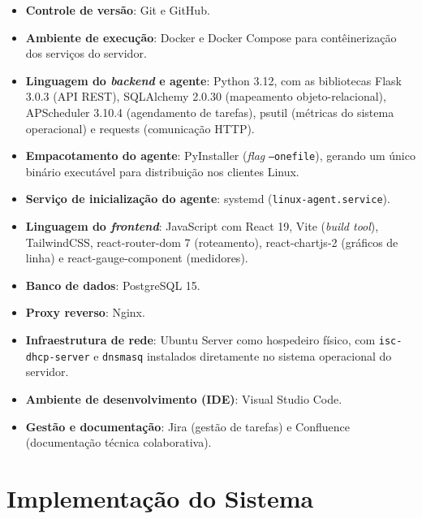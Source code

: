 \documentclass[
    12pt
    ,oneside
    ,a4paper
    ,chapter=TITLE
    ,section=TITLE
    ,sumario=abnt-6027-2012]{abntex2}
\begin{document}
\begin{itemize}
    \item \textbf{Controle de versão}: Git e GitHub.
    \item \textbf{Ambiente de execução}: Docker e Docker Compose para contêinerização
          dos serviços do servidor.
    \item \textbf{Linguagem do \textit{backend} e agente}: Python 3.12, com as
          bibliotecas Flask 3.0.3 (API REST), SQLAlchemy 2.0.30 (mapeamento
          objeto-relacional), APScheduler 3.10.4 (agendamento de tarefas), psutil
          (métricas do sistema operacional) e requests (comunicação HTTP).
    \item \textbf{Empacotamento do agente}: PyInstaller (\textit{flag}
          \texttt{--onefile}), gerando um único binário executável para distribuição
          nos clientes Linux.
    \item \textbf{Serviço de inicialização do agente}: systemd
          (\texttt{linux-agent.service}).
    \item \textbf{Linguagem do \textit{frontend}}: JavaScript com React 19, Vite
          (\textit{build tool}), TailwindCSS, react-router-dom 7 (roteamento),
          react-chartjs-2 (gráficos de linha) e react-gauge-component (medidores).
    \item \textbf{Banco de dados}: PostgreSQL 15.
    \item \textbf{Proxy reverso}: Nginx.
    \item \textbf{Infraestrutura de rede}: Ubuntu Server como hospedeiro físico, com
          \texttt{isc-dhcp-server} e \texttt{dnsmasq} instalados diretamente no sistema
          operacional do servidor.
    \item \textbf{Ambiente de desenvolvimento (IDE)}: Visual Studio Code.
    \item \textbf{Gestão e documentação}: Jira (gestão de tarefas) e Confluence
          (documentação técnica colaborativa).
\end{itemize}

\chapter{Implementação do Sistema}
\label{cap:implementacao}
\end{document}
